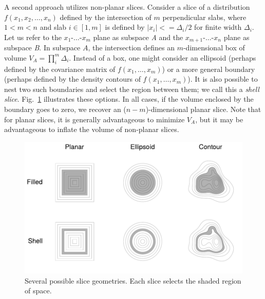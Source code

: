 \documentclass[%
 reprint,
nofootinbib,
 amsmath,amssymb,
 aps,
prstab,
]{revtex4-2}
\begin{document}
A second approach utilizes non-planar slices. Consider a slice of a distribution $f(x_1, x_2, \dots, x_n)$ defined by the intersection of $m$ perpendicular slabs, where $1 < m < n$ and slab $i\in[1, m]$ is defined by $|x_i| <= \Delta_i / 2$ for finite width $\Delta_i$. Let us refer to the $x_1$-$\dots$-$x_m$ plane as subspace \textit{A} and the $x_{m + 1}$-$\dots$-$x_n$ plane as subspace \textit{B}. In subspace $A$, the intersection defines an $m$-dimensional box of volume $V_A = \prod_{i}^{m}\Delta_i$. Instead of a box, one might consider an ellipsoid (perhaps defined by the covariance matrix of $f(x_1, \dots, x_m)$) or a more general boundary (perhaps defined by the density contours of $f(x_1, \dots, x_m)$). It is also possible to nest two such boundaries and select the region between them; we call this a \textit{shell slice}. Fig.~\ref{fig:slices} illustrates these options. In all cases, if the volume enclosed by the boundary goes to zero, we recover an ($n - m$)-dimensional planar slice. Note that for planar slices, it is generally advantageous to minimize $V_A$, but it may be advantageous to inflate the volume of non-planar slices.
%
\begin{figure}
    \centering
    \includegraphics[width=0.85\columnwidth]{fig_slice_diagram.pdf}
    \caption{Several possible slice geometries. Each slice selects the shaded region of space.}
    \label{fig:slices}
\end{figure}
%
\end{document}
